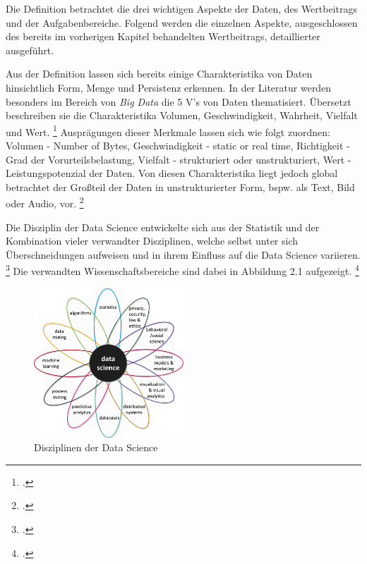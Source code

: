 Die Definition betrachtet die drei wichtigen Aspekte der Daten, des Wertbeitrags und der Aufgabenbereiche.
Folgend werden die einzelnen Aspekte, ausgeschlossen des bereits im vorherigen Kapitel behandelten Wertbeitrags, detaillierter ausgeführt.

Aus der Definition lassen sich bereits einige Charakteristika von Daten hinsichtlich Form, Menge und Persistenz erkennen.
In der Literatur werden besonders im Bereich von \textit{Big Data} die 5 V's von Daten thematisiert.
Übersetzt beschreiben sie die Charakteristika Volumen, Geschwindigkeit, Wahrheit, Vielfalt und Wert. \footcite[Vgl.][S. 1]{Naeem.2022}
Ausprägungen dieser Merkmale lassen sich wie folgt zuordnen: Volumen - Number of Bytes, Geschwindigkeit - static or real time, Richtigkeit - Grad der Vorurteilsbelastung, Vielfalt - strukturiert oder unstrukturiert, Wert - Leistungspotenzial der Daten.
Von diesen Charakteristika liegt jedoch global betrachtet der Großteil der Daten in unstrukturierter Form, bspw. als Text, Bild oder Audio, vor. \footcite[Vgl.][S. 4]{vanderAalst.2016}

Die Disziplin der Data Science entwickelte sich aus der Statistik und der Kombination vieler verwandter Disziplinen, welche selbst unter sich Überschneidungen aufweisen und in ihrem Einfluss auf die Data Science variieren. \footcite[Vgl.][S. 12]{vanderAalst.2016}
Die verwandten Wissenschaftsbereiche sind dabei in Abbildung 2.1 aufgezeigt. \footcite[Vgl.][S. 12]{vanderAalst.2016}

\begin{figure}[htb]
    \centering
    \includegraphics[width=0.5\textwidth]{graphics/ds_disciplines.png}
    \caption{Disziplinen der Data Science}
    \label{fig:data science disciplines}
\end{figure}

